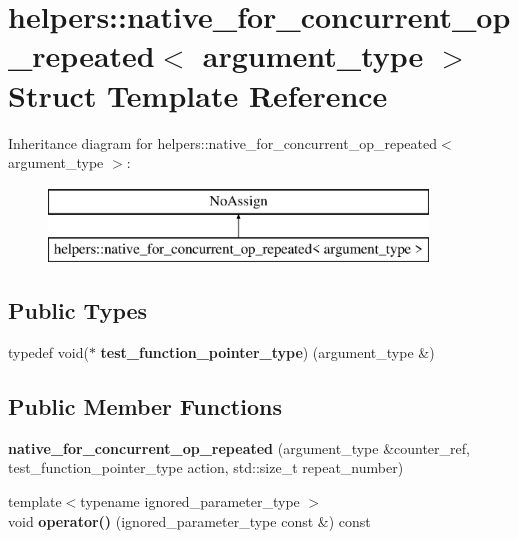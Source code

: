 \hypertarget{structhelpers_1_1native__for__concurrent__op__repeated}{}\section{helpers\+:\+:native\+\_\+for\+\_\+concurrent\+\_\+op\+\_\+repeated$<$ argument\+\_\+type $>$ Struct Template Reference}
\label{structhelpers_1_1native__for__concurrent__op__repeated}
Inheritance diagram for helpers\+:\+:native\+\_\+for\+\_\+concurrent\+\_\+op\+\_\+repeated$<$ argument\+\_\+type $>$\+:\begin{figure}[H]
\begin{center}
\leavevmode
\includegraphics[height=2.000000cm]{structhelpers_1_1native__for__concurrent__op__repeated}
\end{center}
\end{figure}
\subsection*{Public Types}
\begin{DoxyCompactItemize}
\item 
\hypertarget{structhelpers_1_1native__for__concurrent__op__repeated_a1f1a2e1be1bde1374595447fc3ea68ff}{}typedef void($\ast$ {\bfseries test\+\_\+function\+\_\+pointer\+\_\+type}) (argument\+\_\+type \&)\label{structhelpers_1_1native__for__concurrent__op__repeated_a1f1a2e1be1bde1374595447fc3ea68ff}

\end{DoxyCompactItemize}
\subsection*{Public Member Functions}
\begin{DoxyCompactItemize}
\item 
\hypertarget{structhelpers_1_1native__for__concurrent__op__repeated_a16897dbd912c2d92bf11eb8427e2ff7a}{}{\bfseries native\+\_\+for\+\_\+concurrent\+\_\+op\+\_\+repeated} (argument\+\_\+type \&counter\+\_\+ref, test\+\_\+function\+\_\+pointer\+\_\+type action, std\+::size\+\_\+t repeat\+\_\+number)\label{structhelpers_1_1native__for__concurrent__op__repeated_a16897dbd912c2d92bf11eb8427e2ff7a}

\item 
\hypertarget{structhelpers_1_1native__for__concurrent__op__repeated_a05dc53ca13507dff461df958dad63039}{}{\footnotesize template$<$typename ignored\+\_\+parameter\+\_\+type $>$ }\\void {\bfseries operator()} (ignored\+\_\+parameter\+\_\+type const \&) const \label{structhelpers_1_1native__for__concurrent__op__repeated_a05dc53ca13507dff461df958dad63039}

\end{DoxyCompactItemize}
